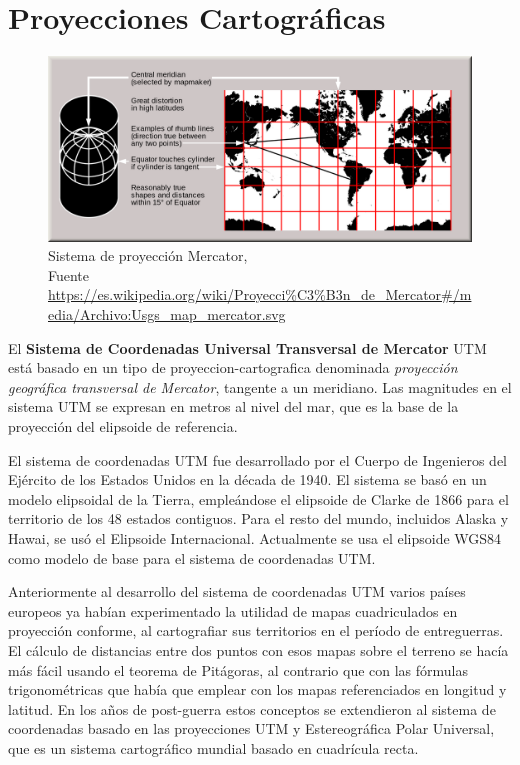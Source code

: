 \chapter{Proyecciones Cartogr\'aficas}
\label{sec:proyecciones.cartograficos}


\begin{figure}[!htb]
  \centering
  \includegraphics[width=\textwidth]{06.radionavegacion/Imagenes/proyeccion_mercator.png}
  \caption{\centering Sistema de proyecci\'on  Mercator, \\{\scriptsize Fuente \url{https://es.wikipedia.org/wiki/Proyecci%C3%B3n_de_Mercator#/media/Archivo:Usgs_map_mercator.svg}}}
  \label{fig:sistema.proyeccion.mercator}
\end{figure}



El \textbf{Sistema de Coordenadas Universal Transversal de Mercator} \ac{UTM} est\'a basado en un tipo de \gls{proyeccion-cartografica} denominada \emph{proyecci\'on geogr\'afica transversal de Mercator}, tangente a un meridiano. Las magnitudes en el sistema \ac{UTM} se expresan en metros al nivel del mar, que es la base de la proyecci\'on del elipsoide de referencia.

El sistema de coordenadas \ac{UTM} fue desarrollado por el Cuerpo de Ingenieros del Ejército de los Estados Unidos en la década de 1940. El sistema se basó en un modelo elipsoidal de la Tierra, emple\'andose el elipsoide de Clarke de 1866 para el territorio de los 48 estados contiguos. Para el resto del mundo, incluidos Alaska y Hawai, se usó el Elipsoide Internacional. Actualmente se usa el elipsoide WGS84 como modelo de base para el sistema de coordenadas \ac{UTM}.

Anteriormente al desarrollo del sistema de coordenadas \ac{UTM} varios países europeos ya habían experimentado la utilidad de mapas cuadriculados en proyección conforme, al cartografiar sus territorios en el período de entreguerras. El cálculo de distancias entre dos puntos con esos mapas sobre el terreno se hacía más fácil usando el teorema de Pitágoras, al contrario que con las fórmulas trigonométricas que había que emplear con los mapas referenciados en longitud y latitud. En los años de post-guerra estos conceptos se extendieron al sistema de coordenadas basado en las proyecciones \ac{UTM} y Estereográfica Polar Universal, que es un sistema cartográfico mundial basado en cuadrícula recta.

